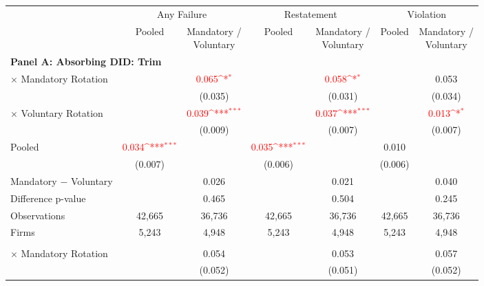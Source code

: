 \documentclass[10pt]{article}
\newcommand{\sym}[1]{\textsuperscript{#1}}
\begin{document}
\begin{minipage}{19cm}\fontsize{10}{12}\selectfont\setlength{\tabcolsep}{4pt}\renewcommand{\arraystretch}{1.12}


\def\sym#1{\ifmmode^{#1}\else\(^{#1}\)\fi}
\centering
{}
\label{tab:absorbing-transition-akm-restatement-bad-downgrade-no-auditfirm-fe}
\begin{threeparttable}

\begin{tabular}{l cc cc cc}
\toprule
 & \multicolumn{2}{c}{Any Failure} & \multicolumn{2}{c}{Restatement} & \multicolumn{2}{c}{Violation} \\
\cmidrule(lr){2-3}\cmidrule(lr){4-5}\cmidrule(lr){6-7}
 & Pooled & \shortstack{Mandatory /\\Voluntary} & Pooled & \shortstack{Mandatory /\\Voluntary} & Pooled & \shortstack{Mandatory /\\Voluntary} \\
\midrule
\multicolumn{7}{l}{\textbf{Panel A: Absorbing DID: Trim}} \\
$\times$ Mandatory Rotation &  & \textcolor{red}{0.065\sym{*}} &  & \textcolor{red}{0.058\sym{*}} &  & 0.053 \\
 &  & (0.035) &  & (0.031) &  & (0.034) \\
$\times$ Voluntary Rotation &  & \textcolor{red}{0.039\sym{***}} &  & \textcolor{red}{0.037\sym{***}} &  & \textcolor{red}{0.013\sym{*}} \\
 &  & (0.009) &  & (0.007) &  & (0.007) \\
Pooled & \textcolor{red}{0.034\sym{***}} &  & \textcolor{red}{0.035\sym{***}} &  & 0.010 &  \\
 & (0.007) &  & (0.006) &  & (0.006) &  \\
Mandatory $-$ Voluntary &  & 0.026 &  & 0.021 &  & 0.040 \\
Difference p-value &  & 0.465 &  & 0.504 &  & 0.245 \\
Observations & 42,665 & 36,736 & 42,665 & 36,736 & 42,665 & 36,736 \\
Firms & 5,243 & 4,948 & 5,243 & 4,948 & 5,243 & 4,948 \\
\addlinespace
\multicolumn{7}{l}{\textbf{Panel B: Absorbing DID: Strict}} \\
$\times$ Mandatory Rotation &  & 0.054 &  & 0.053 &  & 0.057 \\
 &  & (0.052) &  & (0.051) &  & (0.052) \\

\end{tabular}
\end{threeparttable}
\end{minipage}
\end{document}
